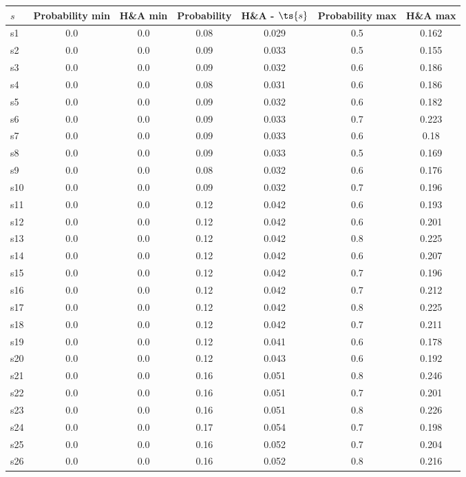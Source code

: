 \documentclass{article}
\begin{document}
\noindent\begin{tabular}{|l|c|c|c|c|c|c|}
\hline
$s$& Probability min & H\&A min & Probability & H\&A - $\ts{s}$ & Probability max & H\&A max\\
\hline
s1 &0.0 & 0.0 & 0.08 & 0.029 & 0.5 & 0.162\\
\hline
s2 &0.0 & 0.0 & 0.09 & 0.033 & 0.5 & 0.155\\
\hline
s3 &0.0 & 0.0 & 0.09 & 0.032 & 0.6 & 0.186\\
\hline
s4 &0.0 & 0.0 & 0.08 & 0.031 & 0.6 & 0.186\\
\hline
s5 &0.0 & 0.0 & 0.09 & 0.032 & 0.6 & 0.182\\
\hline
s6 &0.0 & 0.0 & 0.09 & 0.033 & 0.7 & 0.223\\
\hline
s7 &0.0 & 0.0 & 0.09 & 0.033 & 0.6 & 0.18\\
\hline
s8 &0.0 & 0.0 & 0.09 & 0.033 & 0.5 & 0.169\\
\hline
s9 &0.0 & 0.0 & 0.08 & 0.032 & 0.6 & 0.176\\
\hline
s10 &0.0 & 0.0 & 0.09 & 0.032 & 0.7 & 0.196\\
\hline
s11 &0.0 & 0.0 & 0.12 & 0.042 & 0.6 & 0.193\\
\hline
s12 &0.0 & 0.0 & 0.12 & 0.042 & 0.6 & 0.201\\
\hline
s13 &0.0 & 0.0 & 0.12 & 0.042 & 0.8 & 0.225\\
\hline
s14 &0.0 & 0.0 & 0.12 & 0.042 & 0.6 & 0.207\\
\hline
s15 &0.0 & 0.0 & 0.12 & 0.042 & 0.7 & 0.196\\
\hline
s16 &0.0 & 0.0 & 0.12 & 0.042 & 0.7 & 0.212\\
\hline
s17 &0.0 & 0.0 & 0.12 & 0.042 & 0.8 & 0.225\\
\hline
s18 &0.0 & 0.0 & 0.12 & 0.042 & 0.7 & 0.211\\
\hline
s19 &0.0 & 0.0 & 0.12 & 0.041 & 0.6 & 0.178\\
\hline
s20 &0.0 & 0.0 & 0.12 & 0.043 & 0.6 & 0.192\\
\hline
s21 &0.0 & 0.0 & 0.16 & 0.051 & 0.8 & 0.246\\
\hline
s22 &0.0 & 0.0 & 0.16 & 0.051 & 0.7 & 0.201\\
\hline
s23 &0.0 & 0.0 & 0.16 & 0.051 & 0.8 & 0.226\\
\hline
s24 &0.0 & 0.0 & 0.17 & 0.054 & 0.7 & 0.198\\
\hline
s25 &0.0 & 0.0 & 0.16 & 0.052 & 0.7 & 0.204\\
\hline
s26 &0.0 & 0.0 & 0.16 & 0.052 & 0.8 & 0.216\\

\end{tabular}
\end{document}
